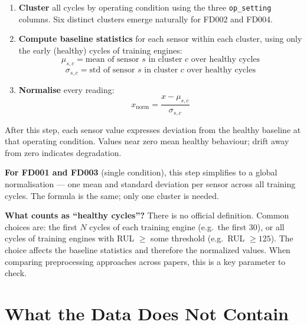 \documentclass[11pt, a4paper]{article}
\begin{document}
\begin{enumerate}
  \item \textbf{Cluster} all cycles by operating condition
        using the three \texttt{op\_setting} columns.
        Six distinct clusters emerge naturally for
        FD002 and FD004.

  \item \textbf{Compute baseline statistics} for each
        sensor within each cluster, using only the early
        (healthy) cycles of training engines:
        \[
          \mu_{s,c} = \text{mean of sensor } s
                      \text{ in cluster } c
                      \text{ over healthy cycles}
        \]
        \[
          \sigma_{s,c} = \text{std of sensor } s
                         \text{ in cluster } c
                         \text{ over healthy cycles}
        \]

  \item \textbf{Normalise} every reading:
        \[
          x_{\text{norm}} = \frac{x - \mu_{s,c}}{\sigma_{s,c}}
        \]
\end{enumerate}

After this step, each sensor value expresses deviation from
the healthy baseline at that operating condition. Values near
zero mean healthy behaviour; drift away from zero indicates
degradation.

\begin{keybox}
\textbf{For FD001 and FD003} (single condition), this step
simplifies to a global normalisation --- one mean and
standard deviation per sensor across all training cycles.
The formula is the same; only one cluster is needed.
\end{keybox}

\begin{insightbox}
\textbf{What counts as ``healthy cycles''?}
There is no official definition. Common choices are:
the first $N$ cycles of each training engine (e.g.\ the
first 30), or all cycles of training engines with
RUL $\geq$ some threshold (e.g.\ RUL $\geq 125$).
The choice affects the baseline statistics and therefore
the normalized values. When comparing preprocessing
approaches across papers, this is a key parameter to check.
\end{insightbox}

\section{What the Data Does Not Contain}
\end{document}
